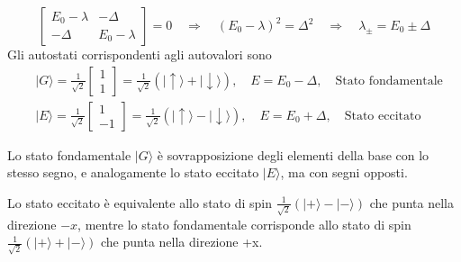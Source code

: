 \begin{equation*}
	\left [ \begin{array}{cc}
		E_0 - \lambda & -\Delta \\ -\Delta & E_0 - \lambda
	\end{array}\right] = 0 \quad \Rightarrow \quad (E_0 - \lambda)^2 = \Delta^2 \quad \Rightarrow \quad \lambda_{\pm} = E_0 \pm \Delta
\end{equation*}
Gli autostati corrispondenti agli autovalori sono
\begin{align}
	& |G \rangle = \frac{1}{\sqrt{2}} \left [ \begin{array}{c}
		1 \\ 1
	\end{array}\right ] = \frac{1}{\sqrt{2}}(|\uparrow \rangle + |\downarrow \rangle), \quad E = E_0 - \Delta, \quad \text{Stato fondamentale} \\
	& |E \rangle = \frac{1}{\sqrt{2}} \left [ \begin{array}{c}
		1 \\ -1
	\end{array}\right ] = \frac{1}{\sqrt{2}}(|\uparrow \rangle - |\downarrow \rangle), \quad E = E_0 + \Delta, \quad \text{Stato eccitato} 
\end{align}

Lo stato fondamentale $|G \rangle$ \`e sovrapposizione degli elementi della base con lo stesso segno, e analogamente lo stato eccitato $|E \rangle$, ma con segni opposti.

Lo stato eccitato \`e equivalente allo stato di spin $\frac{1}{\sqrt{2}}(|+ \rangle - |-\rangle)$ che punta nella direzione $-x$, mentre lo stato fondamentale corrisponde allo stato di spin $\frac{1}{\sqrt{2}}(|+ \rangle + |-\rangle)$ che punta nella direzione +x.

